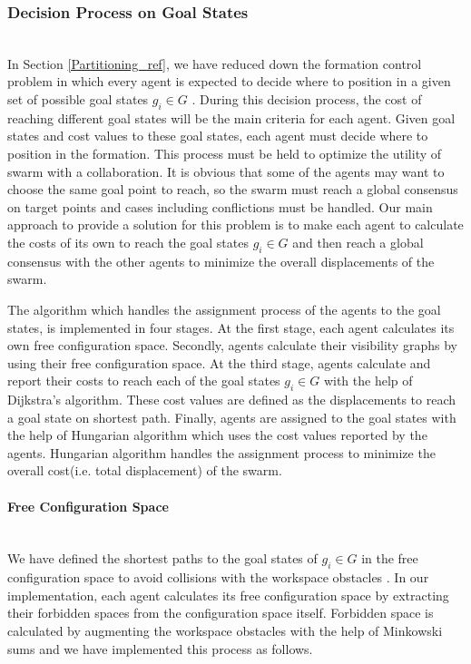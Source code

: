 	
\subsubsection{Decision Process on Goal States}\hspace{0pt} \label{DecisionProcess Ref} \\
In Section \ref{Partitioning_ref}, we have reduced down the formation control problem in which every agent is expected to decide where to position in a given set of possible goal states $g_i \in G$ .  During this decision process, the cost of reaching different goal states will be the main criteria for each agent. Given goal states and cost values to these goal states, each agent must decide where to position in the formation. This process must be held to optimize the utility of swarm with a collaboration. It is obvious that some of the agents may want to choose the same goal point to reach, so the swarm must reach a global consensus on target points and cases including conflictions must be handled. Our main approach to provide a solution for this problem is to make each agent to calculate the costs of its own to reach the goal states $g_i \in G$ and then reach a global consensus with the other agents to minimize the overall displacements of the swarm. 

The algorithm which handles the assignment process of the agents to the goal states, is implemented in four stages. At the first stage, each agent calculates its own free configuration space. Secondly, agents calculate their visibility graphs by using their free configuration space. At the third stage,  agents calculate and report their costs to reach each of the goal states $g_i \in G$ with the help of Dijkstra's algorithm. These cost values are defined as the displacements to reach a goal state on shortest path.  Finally, agents are assigned to the goal states with the help of Hungarian algorithm which uses the cost values reported by the agents. Hungarian algorithm handles the assignment process to minimize the overall cost(i.e. total displacement) of the swarm.
	
\paragraph{Free Configuration Space}\hspace{0pt} \\
We have defined the shortest paths to the goal states of $g_i \in G$ in the free configuration space to avoid collisions with the workspace obstacles \cite{92}. In our implementation, each agent calculates its free configuration space by extracting their forbidden spaces from the configuration space itself. Forbidden space is calculated by augmenting the workspace obstacles with the help of Minkowski sums and we have implemented this process as follows.

